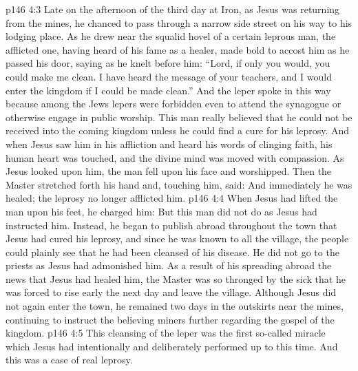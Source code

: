 \vs p146 4:3 \pc Late on the afternoon of the third day at Iron, as Jesus was returning from the mines, he chanced to pass through a narrow side street on his way to his lodging place. As he drew near the squalid hovel of a certain leprous man, the afflicted one, having heard of his fame as a healer, made bold to accost him as he passed his door, saying as he knelt before him: “Lord, if only you would, you could make me clean. I have heard the message of your teachers, and I would enter the kingdom if I could be made clean.” And the leper spoke in this way because among the Jews lepers were forbidden even to attend the synagogue or otherwise engage in public worship. This man really believed that he could not be received into the coming kingdom unless he could find a cure for his leprosy. And when Jesus saw him in his affliction and heard his words of clinging faith, his human heart was touched, and the divine mind was moved with compassion. As Jesus looked upon him, the man fell upon his face and worshipped. Then the Master stretched forth his hand and, touching him, said:  And immediately he was healed; the leprosy no longer afflicted him.
\vs p146 4:4 When Jesus had lifted the man upon his feet, he charged him:  But this man did not do as Jesus had instructed him. Instead, he began to publish abroad throughout the town that Jesus had cured his leprosy, and since he was known to all the village, the people could plainly see that he had been cleansed of his disease. He did not go to the priests as Jesus had admonished him. As a result of his spreading abroad the news that Jesus had healed him, the Master was so thronged by the sick that he was forced to rise early the next day and leave the village. Although Jesus did not again enter the town, he remained two days in the outskirts near the mines, continuing to instruct the believing miners further regarding the gospel of the kingdom.
\vs p146 4:5 This cleansing of the leper was the first so\hyp{}called miracle which Jesus had intentionally and deliberately performed up to this time. And this was a case of real leprosy.
